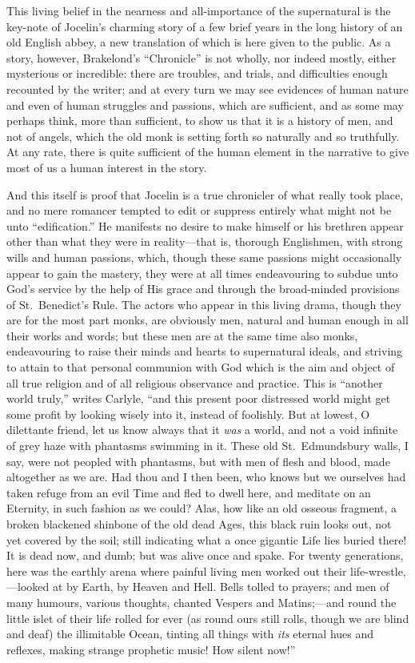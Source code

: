 \documentclass{book}
\begin{document}
{{This living belief in the nearness and all-importance of the supernatural is the key-note of Jocelin's charming story of a few brief years in the long history of an old English abbey, a new translation of which is here given to the public. As a story, however, Brakelond's ``Chronicle'' is not wholly, nor indeed mostly, either mysterious or incredible: there are troubles, and trials, and difficulties enough recounted by the writer; and at every turn we may see evidences of human nature and even of human struggles and passions, which are sufficient, and as some may perhaps think, more than sufficient, to show us that it is a history of men, and not of angels, which the old monk is setting forth so naturally and so truthfully. At any rate, there is quite sufficient of the human element in the narrative to give most of us a human interest in the story.

And this itself is proof that Jocelin is a true chronicler of what really took place, and no mere romancer tempted to edit or suppress entirely what might not be unto ``edification.'' He manifests no desire to make himself or his brethren appear other than what they were in reality---that is, thorough Englishmen, with strong wills and human passions, which, though these same passions might occasionally appear to gain the mastery, they were at all times endeavouring to subdue unto God's service by the help of His grace and through the broad-minded provisions of St.\ Benedict's Rule. The actors who appear in this living drama, though they are for the most part monks, are obviously men, natural and human enough in all their works and words; but these men are at the same time also monks, endeavouring to raise their minds and hearts to supernatural ideals, and striving to attain to that personal communion with God which is the aim and object of all true religion and of all religious observance and practice. This is ``another world truly,'' writes Carlyle, ``and this present poor distressed world might get some profit by looking wisely into it, instead of foolishly. But at lowest, O dilettante friend, let us know always that it \emph{was} a world, and not a void infinite of grey haze with phantasms swimming in it. These old St.\ Edmundsbury walls, I say, were not peopled with phantasms, but with men of flesh and blood, made altogether as we are. Had thou and I then been, who knows but we ourselves had taken refuge from an evil Time and fled to dwell here, and meditate on an Eternity, in such fashion as we could? Alas, how like an old osseous fragment, a broken blackened shinbone of the old dead Ages, this black ruin looks out, not yet covered by the soil; still indicating what a once gigantic Life lies buried there! It is dead now, and dumb; but was alive once and spake. For twenty generations, here was the earthly arena where painful living men worked out their life-wrestle,---looked at by Earth, by Heaven and Hell. Bells tolled to prayers; and men of many humours, various thoughts, chanted Vespers and Matins;---and round the little islet of their life rolled for ever (as round ours still rolls, though we are blind and deaf) the illimitable Ocean, tinting all things with \emph{its} eternal hues and reflexes, making strange prophetic music! How silent now!''

}}
\end{document}
